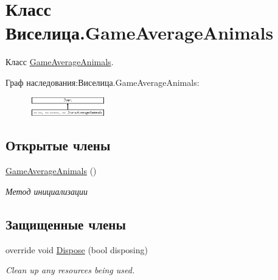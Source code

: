 \hypertarget{class_xD0_x92_xD0_xB8_xD1_x81_xD0_xB5_xD0_xBB_xD0_xB8_xD1_x86_xD0_xB0_1_1_game_average_animals}{\section{Класс Виселица.\+Game\+Average\+Animals}
\label{class_xD0_x92_xD0_xB8_xD1_x81_xD0_xB5_xD0_xBB_xD0_xB8_xD1_x86_xD0_xB0_1_1_game_average_animals}
}


Класс \hyperlink{class_xD0_x92_xD0_xB8_xD1_x81_xD0_xB5_xD0_xBB_xD0_xB8_xD1_x86_xD0_xB0_1_1_game_average_animals}{Game\+Average\+Animals}.  


Граф наследования\+:Виселица.\+Game\+Average\+Animals\+:\begin{figure}[H]
\begin{center}
\leavevmode
\includegraphics[height=0.817518cm]{class_xD0_x92_xD0_xB8_xD1_x81_xD0_xB5_xD0_xBB_xD0_xB8_xD1_x86_xD0_xB0_1_1_game_average_animals}
\end{center}
\end{figure}
\subsection*{Открытые члены}
\begin{DoxyCompactItemize}
\item 
\hyperlink{class_xD0_x92_xD0_xB8_xD1_x81_xD0_xB5_xD0_xBB_xD0_xB8_xD1_x86_xD0_xB0_1_1_game_average_animals_a6520daaaf168e705f0c21c47faee4e97}{Game\+Average\+Animals} ()
\begin{DoxyCompactList}\small\item\em Метод инициализации \end{DoxyCompactList}\end{DoxyCompactItemize}
\subsection*{Защищенные члены}
\begin{DoxyCompactItemize}
\item 
override void \hyperlink{class_xD0_x92_xD0_xB8_xD1_x81_xD0_xB5_xD0_xBB_xD0_xB8_xD1_x86_xD0_xB0_1_1_game_average_animals_aff15e530827ffb61aa3edb7f0db2f11d}{Dispose} (bool disposing)
\begin{DoxyCompactList}\small\item\em Clean up any resources being used. \end{DoxyCompactList}\end{DoxyCompactItemize}


